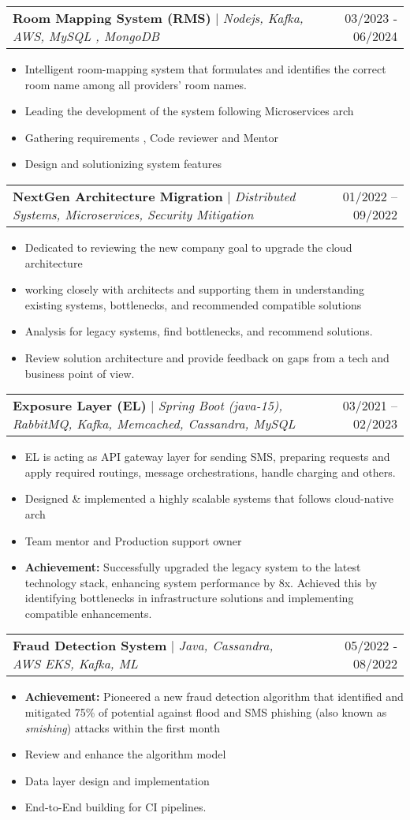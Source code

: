 \documentclass[letterpaper,11pt]{article}
\makeatletter
\newcommand{\resumeItem}[1]{
  \item\small{
    {#1 \vspace{-2pt}}
  }
}
\newcommand{\resumeProjectHeading}[2]{
    \item
    \begin{tabular*}{0.97\textwidth}{l@{\extracolsep{\fill}}r}
      \small#1 & #2 \\
    \end{tabular*}\vspace{-7pt}
}
\newcommand{\resumeItemListStart}{\begin{itemize}}
\newcommand{\resumeItemListEnd}{\end{itemize}\vspace{-5pt}}
\makeatother
\begin{document}
        \resumeProjectHeading
        {\textbf{Room Mapping System (RMS)} $|$ \footnotesize\emph{Nodejs, Kafka, AWS, MySQL , MongoDB}}{03/2023 - 06/2024}
        \resumeItemListStart
            \resumeItem{Intelligent room-mapping system that formulates and identifies the correct room name among all providers' room names.}
            \resumeItem{Leading the development of the system following Microservices arch}
            \resumeItem{Gathering requirements , Code reviewer and Mentor }
            \resumeItem{Design and solutionizing system features}
          \resumeItemListEnd
    
    	\newpage
        \resumeProjectHeading
        {\textbf{NextGen Architecture Migration} $|$ \footnotesize\emph{Distributed Systems, Microservices, Security Mitigation}}
        {01/2022 -- 09/2022}
        \resumeItemListStart
            \resumeItem{Dedicated to reviewing the new company goal to upgrade the cloud architecture}
            \resumeItem{working closely with architects and supporting them in understanding existing systems, bottlenecks, and recommended compatible solutions}
            \resumeItem{Analysis for legacy systems, find bottlenecks, and recommend solutions.}
            \resumeItem{Review solution architecture and provide feedback on gaps from a tech and business point of view. }
          \resumeItemListEnd

        \resumeProjectHeading
        {\textbf{Exposure Layer (EL)} $|$ \footnotesize\emph{Spring Boot (java-15), RabbitMQ, Kafka, Memcached, Cassandra, MySQL}}
        {03/2021 -- 02/2023}
        \resumeItemListStart
            \resumeItem{EL is acting as API gateway layer for sending SMS, preparing requests and apply required routings, message orchestrations, handle charging and others.}
            \resumeItem{Designed \& implemented a highly scalable systems that follows cloud-native arch}
            \resumeItem{Team mentor and Production support owner}
            \resumeItem{\textbf{Achievement:} Successfully upgraded the legacy system to the latest technology stack, enhancing system performance by 8x. Achieved this by identifying bottlenecks in infrastructure solutions and implementing compatible enhancements. }
          \resumeItemListEnd
          
      \resumeProjectHeading
        {\textbf{Fraud Detection System} $|$ \footnotesize\emph{Java, Cassandra, AWS EKS, Kafka, ML}}{05/2022 - 08/2022}
        \resumeItemListStart
            \resumeItem{\textbf{Achievement:} Pioneered a new fraud detection algorithm that identified and mitigated 75\% of potential against flood and SMS phishing (also known as \textit{smishing}) attacks within the first month}
            \resumeItem{Review and enhance the algorithm model}
            \resumeItem{Data layer design and implementation}
            \resumeItem{End-to-End building for CI pipelines.}
        \resumeItemListEnd
\end{document}
